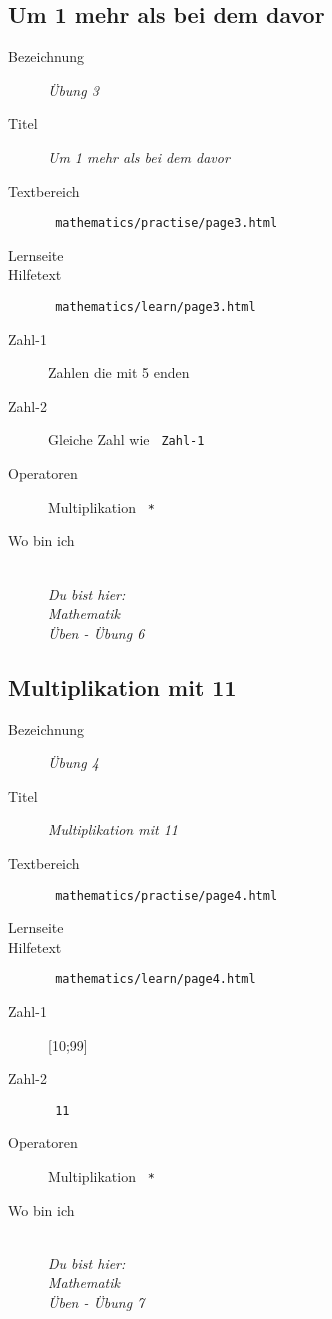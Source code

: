 \subsection{ Um 1 mehr als bei dem davor }
\label{cha:math-practise-page6}
\begin{description}
  \item[Bezeichnung] \emph{ Übung 3 }
  \item[Titel] \emph{ Um 1 mehr als bei dem davor }
  \item[Textbereich] \texttt{ mathematics/practise/page3.html }
  \item[Lernseite] 
  \item[Hilfetext] \texttt{ mathematics/learn/page3.html }
  \item[Zahl-1] Zahlen die mit 5 enden
  \item[Zahl-2] Gleiche Zahl wie \texttt{ Zahl-1 }
  \item[Operatoren] Multiplikation \texttt{ * }
  \item[Wo bin ich] \emph{\\Du bist hier:\\Mathematik\\Üben - Übung 6}
\end{description}


\subsection{ Multiplikation mit 11 }
\label{cha:math-practise-page7}
\begin{description}
  \item[Bezeichnung] \emph{ Übung 4 }
  \item[Titel] \emph{ Multiplikation mit 11 }
  \item[Textbereich] \texttt{ mathematics/practise/page4.html }
  \item[Lernseite] 
  \item[Hilfetext] \texttt{ mathematics/learn/page4.html }
  \item[Zahl-1] [10;99]
  \item[Zahl-2] \texttt{ 11 }
  \item[Operatoren] Multiplikation \texttt{ * }
  \item[Wo bin ich] \emph{\\Du bist hier:\\Mathematik\\Üben - Übung 7}
\end{description}


